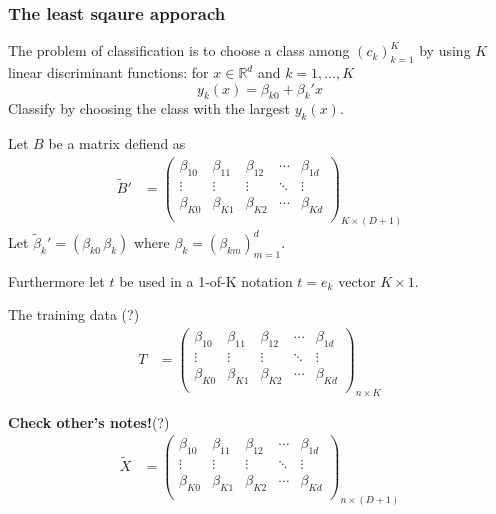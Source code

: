 \documentclass[a4paper]{article}
\newcommand{\Real}{\mathbb{R}}
\begin{document}

\subsubsection{The least sqaure apporach} %
\label{ssub:the_least_sqaure_apporach}

The problem of classification is to choose a class among $(c_k)_{k=1}^K$ by using
$K$ linear discriminant functions: for $x\in \Real^d$ and $k=1,\ldots, K$
\[y_k(x) = \beta_{k0} + \beta_k'x\]
Classify by choosing the class with the largest $y_k(x)$.

Let $B$ be a matrix defiend as 
\begin{align*}
\tilde{B}' &= \begin{pmatrix}
	\beta_{10} 	& \beta_{11} 		& \beta_{12} 		& \cdots & \beta_{1d} \\
	\vdots 	& \vdots	& \vdots 	& \ddots & \vdots \\
	\beta_{K0} 	& \beta_{K1} 		& \beta_{K2} 		& \cdots & \beta_{Kd} \\
	\end{pmatrix}_{K\times (D+1)}
\end{align*}
Let $\tilde{\beta}_k' = (\beta_{k0}\, \beta_k)$ where $\beta_k = (\beta_{km})_{m=1}^d$.

Furthermore let $t$ be used in a 1-of-K notation $t = e_k$ vector $K\times 1$.

The training data (?)
\begin{align*}
T &= \begin{pmatrix}
	\beta_{10} 	& \beta_{11} 		& \beta_{12} 		& \cdots & \beta_{1d} \\
	\vdots 	& \vdots	& \vdots 	& \ddots & \vdots \\
	\beta_{K0} 	& \beta_{K1} 		& \beta_{K2} 		& \cdots & \beta_{Kd} \\
	\end{pmatrix}_{n\times K}
\end{align*}

\textbf{Check other's notes!}(?)
\begin{align*}
\tilde{X} &= \begin{pmatrix}
	\beta_{10} 	& \beta_{11} 		& \beta_{12} 		& \cdots & \beta_{1d} \\
	\vdots 	& \vdots	& \vdots 	& \ddots & \vdots \\
	\beta_{K0} 	& \beta_{K1} 		& \beta_{K2} 		& \cdots & \beta_{Kd} \\
	\end{pmatrix}_{n\times (D+1)}
\end{align*}
\end{document}
